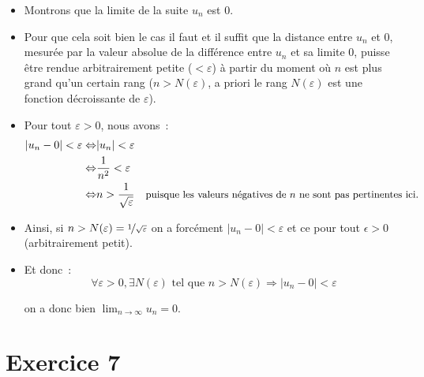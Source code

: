 \documentclass[9pt,handout,hyperref]{beamer}
\begin{document}
\begin{frame}

  \begin{itemize}
  \item Montrons que la limite de la suite $u_n$ est 0.\newline

  \item Pour que cela soit bien le cas il faut et il suffit que la distance entre $u_n$ et 0, mesurée par la valeur absolue de la différence entre $u_n$ et sa limite 0, puisse être rendue arbitrairement petite ($<\varepsilon$) à partir du moment où $n$ est plus grand qu'un certain rang ($n>N(\varepsilon)$, a priori le rang $N(\varepsilon)$ est une fonction décroissante de $\varepsilon$).\newline

  \item Pour tout $\varepsilon>0$, nous avons~:
    \[
      \begin{split}
        |u_n - 0| < \varepsilon \Leftrightarrow &  |u_n| < \varepsilon \\
        \Leftrightarrow & \frac{1}{n^2} < \varepsilon \\
        \Leftrightarrow & n > \frac{1}{\sqrt{\varepsilon}} \quad\small{\text{puisque les valeurs négatives de $n$ ne sont pas pertinentes ici.}}
      \end{split}
    \]

  \item Ainsi, si $n>N(\varepsilon)=\nicefrac{1}{\sqrt{\varepsilon}}$ on a forcément $|u_n-0|<\varepsilon$ et ce pour tout $\epsilon>0$ (arbitrairement petit).\newline

  \item Et donc~:\newline
    \[
      \forall \varepsilon>0, \exists N(\varepsilon) \text{ tel que } n>N(\varepsilon) \Rightarrow |u_n-0|<\varepsilon
    \]

    \bigskip

    \noindent on a donc bien $\lim_{n\rightarrow\infty}u_n=0$.

  \end{itemize}

\end{frame}

\section{Exercice 7}
\end{document}
